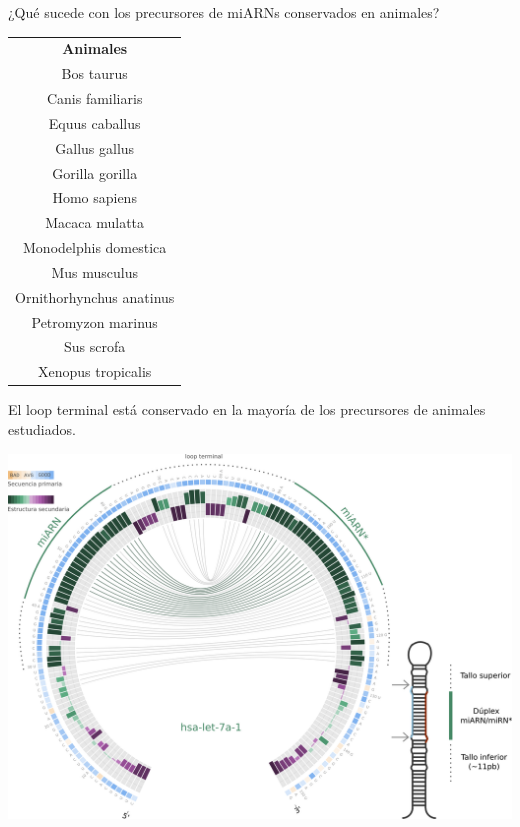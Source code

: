 \documentclass{beamer}
\begin{document}
\begin{frame}{¿Qué sucede con los precursores de miARNs conservados en animales?}
\begin{table}[]
    \centering
    \tiny
    \begin{tabular}{c}
    \textbf{Animales}        \\
        Bos taurus               \\
        Canis familiaris         \\
        Equus caballus           \\
        Gallus gallus            \\
        Gorilla gorilla          \\
        Homo sapiens             \\
        Macaca mulatta           \\
        Monodelphis domestica    \\
        Mus musculus             \\
        Ornithorhynchus anatinus \\
        Petromyzon marinus       \\
        Sus scrofa               \\
        Xenopus tropicalis      
    \end{tabular}
    \end{table}
\end{frame}


\begin{frame}{
El loop terminal está conservado en la mayoría de los precursores de animales estudiados.}
	\begin{center}
		\includegraphics[width=.8\textwidth]{img/hsa-let-7a-1_circos_defensa.png}
	\end{center}
\end{frame}
\end{document}
